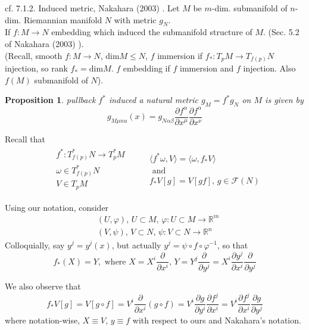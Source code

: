 \documentclass[10pt]{amsart}
\newtheorem{proposition}{Proposition}
\begin{document}
\begin{multicols*}{2}
cf. 7.1.2. Induced metric, Nakahara (2003) \cite{Naka2003}. Let $M$ be $m$-dim. submanifold of $n$-dim. Riemannian manifold $N$ with metric $g_N$. \\
If $f:M \to N$ embedding which induced the submanifold structure of $M$. (Sec. 5.2 of Nakahara (2003) \cite{Naka2003}). \\
(Recall, smooth $f: M \to N$, $\text{dim}M \leq N$, $f$ immersion if $f_* : T_pM \to T_{f(p)}N$ injection, so rank $f_* = \text{dim}M$. $f$ embedding if $f$ immersion and $f$ injection. Also $f(M)$ submanifold of $N$).

\begin{proposition}
pullback $f^*$ induced a natural metric $g_M = f^* g_N$ on $M$ is given by
\begin{equation}
	g_{M\mu nu} (x) = g_{N \alpha \beta} \frac{\partial f^{\alpha}}{\partial x^{\mu}}\frac{\partial f^{\alpha} }{ \partial x^{\nu}}
\end{equation}
\end{proposition}

Recall that
\[
\begin{gathered}
\begin{aligned}
	& f^* : T^*_{f(p)}N \to T_p^* M \\
	& \omega \in T^*_{f(p)}N \\
	& V \in T_p M
\end{aligned} \quad \quad \, 
\begin{gathered}
\langle f^* \omega, V \rangle = \langle \omega, f_* V \rangle \\
\text{ and } \\
f_*V[g] = V[gf], \, g\in \mathcal{F}(N)
\end{gathered}
\end{gathered}
\]

Using our notation, consider \\
\[
\begin{aligned}
	& (U, \varphi), \, U\subset M, \, \varphi : U \subset M \to \mathbb{R}^m \\
	& (V, \psi), \, V \subset N, \, \psi : V \subset N \to \mathbb{R}^n
\end{aligned}
\]
Colloquially, say $y^j = y^j(x)$, but actually $y^j = \psi \circ f\circ \varphi^{-1}$, so that
\[
f_*(X) = Y, \text{ where } X= X^i \frac{ \partial }{ \partial x^i }, \, Y = Y^j \frac{\partial }{ \partial y^j} = X^i \frac{ \partial y^j}{\partial x^i } \frac{ \partial }{ \partial y^j}
\]

We also observe that 
\[
f_* V[g] = V[g\circ f] = V^i \frac{ \partial }{ \partial x^i} (g\circ f) = V^i \frac{ \partial g}{ \partial y^i} \frac{ \partial f^j}{ \partial x^i } = V^i \frac{ \partial f^j}{ \partial x^i } \frac{ \partial g}{ \partial y^j}
\]
where notation-wise, $X\equiv V$, $y\equiv f$ with respect to ours and Nakahara's notation. \\


\end{multicols*}
\end{document}
